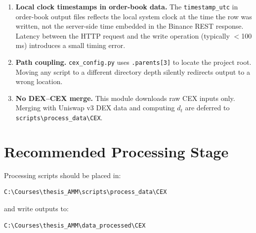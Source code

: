 \documentclass[11pt,a4paper]{article}
\begin{document}
\begin{enumerate}
  \item \textbf{Local clock timestamps in order-book data.}
        The \texttt{timestamp\_utc} in order-book output files
        reflects the local system clock at the time the row was
        written, not the server-side time embedded in the Binance
        REST response. Latency between the HTTP request and the
        write operation (typically $<$100 ms) introduces a small
        timing error.

  \item \textbf{Path coupling.}
        \texttt{cex\_config.py} uses \texttt{.parents[3]} to locate
        the project root. Moving any script to a different directory
        depth silently redirects output to a wrong location.

  \item \textbf{No DEX--CEX merge.}
        This module downloads raw CEX inputs only. Merging with
        Uniswap v3 DEX data and computing $d_t$ are deferred to
        \texttt{scripts\textbackslash process\_data\textbackslash CEX}.
\end{enumerate}

\section{Recommended Processing Stage}
\label{sec:proc}

Processing scripts should be placed in:
\begin{lstlisting}
C:\Courses\thesis_AMM\scripts\process_data\CEX
\end{lstlisting}
and write outputs to:
\begin{lstlisting}
C:\Courses\thesis_AMM\data_processed\CEX
\end{lstlisting}
\end{document}
